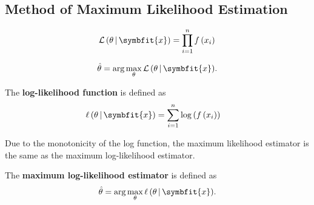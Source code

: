 \documentclass{article}
\begin{document}
\begin{multicols}{3}
\subsection{Method of Maximum Likelihood Estimation}
\begin{definition}
    \begin{equation*}
        \mathcal{L}\left( \theta \,\vert\, \symbfit{x} \right) = \prod_{i = 1}^n f\left( x_i \right) \\
    \end{equation*}
\end{definition}
\begin{definition}
    \begin{equation*}
        \hat{\theta} = \arg\max_\theta{\mathcal{L}\left( \theta \,\vert\, \symbfit{x} \right)}.
    \end{equation*}
\end{definition}
\begin{definition}
    The \textbf{log-likelihood function} is defined as
    \begin{align*}
        \ell\left( \theta \,\vert\, \symbfit{x} \right)& = \sum_{i = 1}^n \log{\left( f\left( x_i \right) \right)}
    \end{align*}
\end{definition}
Due to the monotonicity of the log function, the maximum likelihood estimator is the same as the maximum log-likelihood estimator.
\begin{definition}
    The \textbf{maximum log-likelihood estimator} is defined as
    \begin{equation*}
        \hat{\theta} = \arg\max_\theta{\ell\left( \theta \,\vert\, \symbfit{x} \right)}.
    \end{equation*}
\end{definition}

\end{multicols}
\end{document}
